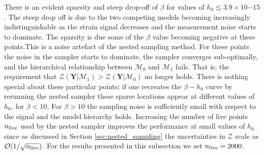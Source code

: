 \documentclass[fleqn,usenatbib,useAMS]{mnras}
\providecommand{\DIFadd}[1]{{\protect\color{blue}\uwave{#1}}} %
\providecommand{\DIFdel}[1]{{\protect\color{red}\sout{#1}}}                      %
\providecommand{\DIFaddbegin}{} %
\providecommand{\DIFaddend}{} %
\providecommand{\DIFdelbegin}{} %
\providecommand{\DIFdelend}{} %
\newcommand{\DIFscaledelfig}{0.5}
\newlength{\DIFdelgraphicswidth} %
\newlength{\DIFdelgraphicsheight} %
\newcommand{\DIFaddincludegraphics}[2][]{{\color{blue}\fbox{\DIFOincludegraphics[#1]{#2}}}} %
\newcommand{\DIFdelincludegraphics}[2][]{%
\sbox{\DIFdelgraphicsbox}{\DIFOincludegraphics[#1]{#2}}%
\settoboxwidth{\DIFdelgraphicswidth}{\DIFdelgraphicsbox} %
\settoboxtotalheight{\DIFdelgraphicsheight}{\DIFdelgraphicsbox} %
\scalebox{\DIFscaledelfig}{%
\parbox[b]{\DIFdelgraphicswidth}{\usebox{\DIFdelgraphicsbox}\\[-\baselineskip] \rule{\DIFdelgraphicswidth}{0em}}\llap{\resizebox{\DIFdelgraphicswidth}{\DIFdelgraphicsheight}{%
\setlength{\unitlength}{\DIFdelgraphicswidth}%
\begin{picture}(1,1)%
\thicklines\linethickness{2pt} %
{\color[rgb]{1,0,0}\put(0,0){\framebox(1,1){}}}%
{\color[rgb]{1,0,0}\put(0,0){\line( 1,1){1}}}%
{\color[rgb]{1,0,0}\put(0,1){\line(1,-1){1}}}%
\end{picture}%
}\hspace*{3pt}}} %
} %
\DeclareRobustCommand{\DIFaddbegin}{\DIFOaddbegin \let\includegraphics\DIFaddincludegraphics} %
\DeclareRobustCommand{\DIFaddend}{\DIFOaddend \let\includegraphics\DIFOincludegraphics} %
\DeclareRobustCommand{\DIFdelbegin}{\DIFOdelbegin \let\includegraphics\DIFdelincludegraphics} %
\DeclareRobustCommand{\DIFdelend}{\DIFOaddend \let\includegraphics\DIFOincludegraphics} %
\begin{document}
There is an evident sparsity and steep drop-off of $\beta$ for values of \DIFdelbegin \DIFdel{$h_0 \lesssim 3.9 \times10{-15}$}\DIFdelend \DIFaddbegin \DIFadd{$h_0 \lesssim 3.9 \times10^{-15}$}\DIFaddend . The steep drop off is due to the two competing models becoming increasingly indistinguishable as the strain signal decreases and the measurement noise starts to dominate. The sparsity is due some of the $\beta$ value becoming negative at these points.This is a noise artefact of the nested sampling method. For these points the noise in the sampler starts to dominate, the sampler converges sub-optimally, and the hierarchical relationship between $\mathcal{M}_0$ and  $\mathcal{M}_1$ fails. That is, the requirement that $\mathcal{Z}(\boldsymbol{Y} | \mathcal{M}_1) > \mathcal{Z}(\boldsymbol{Y} | \mathcal{M}_0)$ no longer holds. There is nothing special about these particular points; if one recreates the $\beta - h_0$ curve by rerunning the nested sampler these sparse locations appear at different values of $h_0$, for $\beta < 10$. For $\beta > 10$ the sampling noise is sufficiently small with respect to the signal and the model hierarchy holds. Increasing the number of live points $n_{\rm live}$ used by the nested sampler improves the performance at small values of $h_0$ since as discussed in Section \ref{sec:nested_sampling} the uncertainties in $\mathcal{Z}$ scale as $\mathcal{O}(1/ \sqrt{n_{\rm live}})$. For the results presented in this subsection we set $n_{\rm live} =2000$. 
\end{document}
